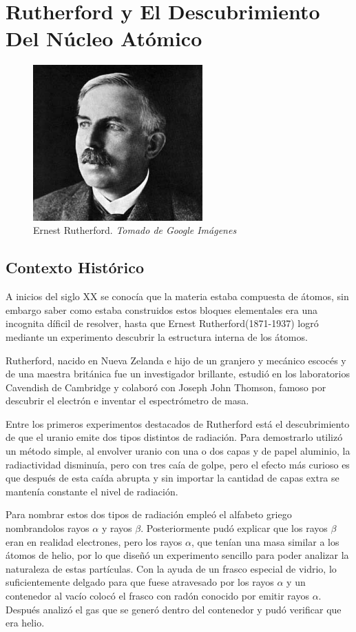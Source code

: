 \documentclass[journal]{IEEEtran}
\begin{document}
\section{Rutherford y El Descubrimiento Del Núcleo Atómico}

\begin{center}
  \begin{figure}[h!]
  \includegraphics[width=65mm]{rutherford.jpg}
  \caption{Ernest Rutherford. \emph{Tomado de Google Imágenes}}
  \end{figure}
\end{center}

\subsection{Contexto Histórico}
A inicios del siglo XX se conocía que la materia estaba compuesta de átomos, sin embargo saber como estaba construidos estos 
bloques elementales era una incognita díficil de resolver, hasta que Ernest Rutherford(1871-1937) logró mediante un experimento
descubrir la estructura interna de los átomos.


Rutherford, nacido en Nueva Zelanda e hijo de un granjero y mecánico escocés y de una maestra británica fue un investigador brillante, estudió en los laboratorios Cavendish 
de Cambridge y colaboró con Joseph John Thomson, famoso por descubrir el electrón e inventar el espectrómetro de masa.

Entre los primeros experimentos destacados de Rutherford está el descubrimiento de que el uranio emite dos tipos distintos de radiación.
Para demostrarlo utilizó un método simple, al envolver uranio con una o dos capas y de papel aluminio, la radiactividad disminuía, pero con tres caía de golpe, pero el efecto más curioso es que después de esta caída  abrupta y sin 
importar la cantidad de capas extra se mantenía constante el nivel de radiación.

Para nombrar estos dos tipos de radiación empleó el alfabeto griego nombrandolos rayos $\alpha$ y rayos $\beta$.
Posteriormente pudó explicar que los rayos $\beta$ eran en realidad electrones, pero los rayos $\alpha$, que tenían una masa similar a los átomos de helio, por lo que diseñó 
un experimento sencillo para poder analizar la naturaleza de estas partículas. 
Con la ayuda de un frasco especial de vidrio, lo suficientemente delgado para que fuese atravesado por los rayos $\alpha$ y un contenedor al vacío colocó el frasco
con radón conocido por emitir rayos $\alpha$. Después analizó el gas que se generó dentro del contenedor y pudó verificar que era helio.
\end{document}
